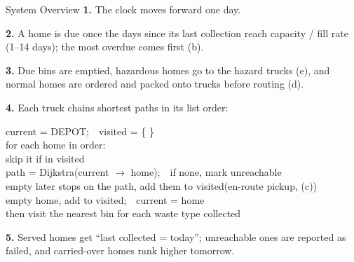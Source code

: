 \documentclass[aspectratio=169,11pt]{beamer}
\newcommand{\formula}[1]{%
    \begin{center}
    \colorbox{DiagFill}{\parbox{0.95\linewidth}{\vspace{3pt}#1\vspace{3pt}}}
    \end{center}
}
\newcommand{\subhead}[1]{{\large #1}}
\begin{document}
\begin{frame}{\subhead{System Overview}}
\scriptsize
\setlength{\parskip}{1pt}
\textbf{1.} The clock moves forward one day.

\textbf{2.} A home is due once the days since its last collection reach capacity / fill rate (1--14 days); the most overdue comes first (b).

\textbf{3.} Due bins are emptied, hazardous homes go to the hazard trucks (e), and normal homes are ordered and packed onto trucks before routing (d).

\textbf{4.} Each truck chains shortest paths in its list order:
\formula{\raggedright\ttfamily\tiny
current = DEPOT;\ \ visited = \{ \}\\
for each home in order:\\
\hspace*{4mm}skip it if in visited\\
\hspace*{4mm}path = Dijkstra(current $\to$ home);\ \ if none, mark unreachable\\
\hspace*{4mm}empty later stops on the path, add them to visited\hfill\textrm{\tiny(en-route pickup, (c))}\\
\hspace*{4mm}empty home, add to visited;\ \ current = home\\
then visit the nearest bin for each waste type collected}

\textbf{5.} Served homes get ``last collected = today''; unreachable ones are reported as failed, and carried-over homes rank higher tomorrow.
\end{frame}
\end{document}
